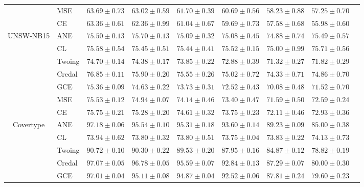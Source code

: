 \documentclass[letterpaper]{article} %
\begin{document}
\begin{table}[t]
\begin{tabular}{clccccccc}
 & MSE    & $\mathbf{63.69 \pm 0.73}$ & $\mathbf{63.02 \pm 0.59}$ & $\mathbf{61.70 \pm 0.39}$ & $\mathbf{60.69 \pm 0.56}$ & $\mathbf{58.23 \pm 0.88}$ & $\mathbf{57.25 \pm 0.70}$ \\
 & CE     & $\mathbf{63.36 \pm 0.61}$ & $\mathbf{62.36 \pm 0.99}$ & $61.04 \pm 0.67$ & $59.69 \pm 0.73$ & $57.58 \pm 0.68$ & $55.98 \pm 0.60$ \\
\hline
\multirow{7}{*}{UNSW-NB15}
 & ANE    & $75.50 \pm 0.13$ & $\mathbf{75.70 \pm 0.13}$ & $75.09 \pm 0.32$ & $\mathbf{75.08 \pm 0.45}$ & $\mathbf{74.88 \pm 0.74}$ & $\mathbf{75.49 \pm 0.57}$ \\
 & CL     & $75.58 \pm 0.54$ & $\mathbf{75.45 \pm 0.51}$ & $\mathbf{75.44 \pm 0.41}$ & $\mathbf{75.52 \pm 0.15}$ & $\mathbf{75.00 \pm 0.99}$ & $\mathbf{75.71 \pm 0.56}$ \\
 & Twoing & $74.70 \pm 0.14$ & $74.38 \pm 0.17$ & $73.85 \pm 0.22$ & $72.88 \pm 0.39$ & $71.32 \pm 0.27$ & $71.82 \pm 0.29$ \\
 & Credal & $\mathbf{76.85 \pm 0.11}$ & $\mathbf{75.90 \pm 0.20}$ & $\mathbf{75.55 \pm 0.26}$ & $\mathbf{75.02 \pm 0.72}$ & $\mathbf{74.33 \pm 0.71}$ & $\mathbf{74.86 \pm 0.70}$ \\
 & GCE    & $75.36 \pm 0.09$ & $74.63 \pm 0.22$ & $73.73 \pm 0.31$ & $72.52 \pm 0.43$ & $70.08 \pm 0.48$ & $71.52 \pm 0.70$ \\
 & MSE    & $75.53 \pm 0.12$ & $74.94 \pm 0.07$ & $74.14 \pm 0.46$ & $73.40 \pm 0.47$ & $71.59 \pm 0.50$ & $72.59 \pm 0.24$ \\
 & CE     & $75.75 \pm 0.21$ & $75.28 \pm 0.20$ & $74.61 \pm 0.32$ & $73.75 \pm 0.23$ & $72.11 \pm 0.46$ & $72.93 \pm 0.36$ \\
\hline
\multirow{7}{*}{Covertype}
 & ANE    & $97.18 \pm 0.06$ & $95.54 \pm 0.10$ & $95.31 \pm 0.18$ & $\mathbf{93.60 \pm 0.14}$ & $\mathbf{89.23 \pm 0.09}$ & $\mathbf{85.00 \pm 0.38}$ \\
 & CL     & $73.94 \pm 0.62$ & $73.80 \pm 0.32$ & $73.80 \pm 0.51$ & $73.75 \pm 0.04$ & $73.83 \pm 0.22$ & $74.13 \pm 0.73$ \\
 & Twoing & $90.72 \pm 0.10$ & $90.30 \pm 0.22$ & $89.53 \pm 0.20$ & $87.95 \pm 0.16$ & $84.87 \pm 0.12$ & $78.82 \pm 0.19$ \\
 & Credal & $97.07 \pm 0.05$ & $\mathbf{96.78 \pm 0.05}$ & $\mathbf{95.59 \pm 0.07}$ & $92.84 \pm 0.13$ & $87.29 \pm 0.07$ & $80.00 \pm 0.30$ \\
 & GCE    & $97.01 \pm 0.04$ & $95.11 \pm 0.08$ & $94.87 \pm 0.04$ & $92.52 \pm 0.06$ & $87.81 \pm 0.24$ & $79.60 \pm 0.23$ \\

\end{tabular}
\end{table}
\end{document}
